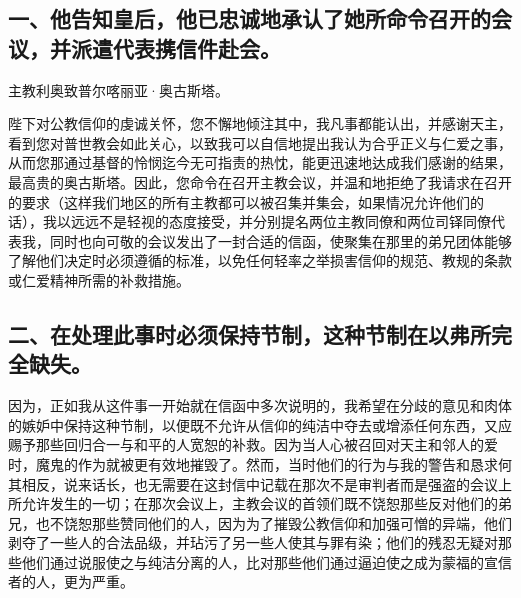 \par


\subsection{一、他告知皇后，他已忠诚地承认了她所命令召开的会议，并派遣代表携信件赴会。}

主教利奥致普尔喀丽亚·奥古斯塔。\par

陛下对公教信仰的虔诚关怀，您不懈地倾注其中，我凡事都能认出，并感谢天主，看到您对普世教会如此关心，以致我可以自信地提出我认为合乎正义与仁爱之事，从而您那通过基督的怜悯迄今无可指责的热忱，能更迅速地达成我们感谢的结果，最高贵的奥古斯塔。因此，您命令在召开主教会议，并温和地拒绝了我请求在召开的要求（这样我们地区的所有主教都可以被召集并集会，如果情况允许他们的话），我以远远不是轻视的态度接受，并分别提名两位主教同僚和两位司铎同僚代表我，同时也向可敬的会议发出了一封合适的信函，使聚集在那里的弟兄团体能够了解他们决定时必须遵循的标准，以免任何轻率之举损害信仰的规范、教规的条款或仁爱精神所需的补救措施。\par


\subsection{二、在处理此事时必须保持节制，这种节制在以弗所完全缺失。}

因为，正如我从这件事一开始就在信函中多次说明的，我希望在分歧的意见和肉体的嫉妒中保持这种节制，以便既不允许从信仰的纯洁中夺去或增添任何东西，又应赐予那些回归合一与和平的人宽恕的补救。因为当人心被召回对天主和邻人的爱时，魔鬼的作为就被更有效地摧毁了。然而，当时他们的行为与我的警告和恳求何其相反，说来话长，也无需要在这封信中记载在那次不是审判者而是强盗的会议上所允许发生的一切；在那次会议上，主教会议的首领们既不饶恕那些反对他们的弟兄，也不饶恕那些赞同他们的人，因为为了摧毁公教信仰和加强可憎的异端，他们剥夺了一些人的合法品级，并玷污了另一些人使其与罪有染；他们的残忍无疑对那些他们通过说服使之与纯洁分离的人，比对那些他们通过逼迫使之成为蒙福的宣信者的人，更为严重。\par



